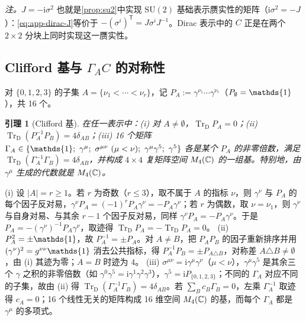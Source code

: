 \documentclass[UTF8,a4paper,11pt,fontset=fandol]{ctexart}
\makeatletter
\let\amsmathbb\mathbb
\renewcommand{\mathbb}[1]{\ifx1#1\mathds{1}\else\amsmathbb{#1}\fi}
\theoremstyle{cplain}
\newtheorem{lemma}[theorem]{引理}
\theoremstyle{cdefinition}
\theoremstyle{cremark}
\renewcommand{\proofname}{证明}
\renewenvironment{proof}[1][\proofname]{\par\pushQED{\qed}\normalfont\topsep6\p@\@plus6\p@\relax
  \trivlist\item[\hskip\labelsep\itshape #1\hspace{0.5em}]\ignorespaces}{\popQED\endtrivlist\@endpefalse}
\numberwithin{equation}{section}
\newcommand{\TrD}{\operatorname{Tr}_{\mathrm{D}}}   %
\newcommand{\tp}{\mathsf{T}}                         %
\newcommand{\ii}{\mathrm{i}}                        %
\makeatother
\begin{document}
\emph{注。}$J=-\ii\sigma^2$ 也就是\cref{prop:su2}中实现 $\mathrm{SU}(2)$ 基础表示赝实性的矩阵（$\ii\sigma^2=-J$）：\cref{eq:app-dirac-J}等价于 $-(\sigma^i)^{\tp}=J\sigma^iJ^{-1}$。Dirac 表示中的 $C$ 正是在两个 $2\times2$ 分块上同时实现这一赝实性。

\subsection{Clifford 基与 \texorpdfstring{$\Gamma_AC$}{Γ\_A C} 的对称性}\label{app:dirac-basis}

对 $\{0,1,2,3\}$ 的子集 $A=\{\nu_1<\cdots<\nu_r\}$，记 $P_A:=\gamma^{\nu_1}\cdots\gamma^{\nu_r}$（$P_\emptyset=\mathbb 1$），共 16 个。

\begin{lemma}[Clifford 基]\label{lem:app-dirac-basis}
在任一表示中：(i) 对 $A\neq\emptyset$，$\TrD P_A=0$；(ii) $\TrD(P_A^{-1}P_B)=4\delta_{AB}$；(iii) 16 个矩阵
$\Gamma_A\in\{\mathbb 1;\ \gamma^\mu;\ \sigma^{\mu\nu}\ (\mu<\nu);\ \gamma^\mu\gamma^5;\ \gamma^5\}$
各是某个 $P_A$ 的非零倍数，满足 $\TrD(\Gamma_A^{-1}\Gamma_B)=4\delta_{AB}$，并构成 $4\times4$ 复矩阵空间 $M_4(\mathbb C)$ 的一组基。特别地，由 $\gamma^\mu$ 生成的代数就是 $M_4(\mathbb C)$。
\end{lemma}

\begin{proof}
(i) 设 $|A|=r\ge1$。若 $r$ 为奇数（$r\le3$），取不属于 $A$ 的指标 $\nu$，则 $\gamma^\nu$ 与 $P_A$ 的每个因子反对易，$\gamma^\nu P_A=(-1)^rP_A\gamma^\nu=-P_A\gamma^\nu$；若 $r$ 为偶数，取 $\nu=\nu_1$，则 $\gamma^\nu$ 与自身对易、与其余 $r-1$ 个因子反对易，同样 $\gamma^\nu P_A=-P_A\gamma^\nu$。于是 $P_A=-(\gamma^\nu)^{-1}P_A\gamma^\nu$，取迹得 $\TrD P_A=-\TrD P_A=0$。
(ii) $P_A^2=\pm\mathbb 1$，故 $P_A^{-1}=\pm P_A$。对 $A\neq B$，把 $P_AP_B$ 的因子重新排序并用 $(\gamma^\nu)^2=g^{\nu\nu}\mathbb 1$ 消去公共指标，得 $P_A^{-1}P_B=\pm P_{A\triangle B}$，对称差 $A\triangle B\neq\emptyset$，由 (i) 其迹为零；$A=B$ 时迹为 $4$。
(iii) $\sigma^{\mu\nu}=\ii\gamma^\mu\gamma^\nu$（$\mu<\nu$），$\gamma^\mu\gamma^5$ 是其余三个 $\gamma$ 之积的非零倍数（如 $\gamma^0\gamma^5=\ii\gamma^1\gamma^2\gamma^3$），$\gamma^5=\ii P_{\{0,1,2,3\}}$；不同的 $\Gamma_A$ 对应不同的子集，故由 (ii) 得 $\TrD(\Gamma_A^{-1}\Gamma_B)=4\delta_{AB}$。若 $\sum_Bc_B\Gamma_B=0$，左乘 $\Gamma_A^{-1}$ 取迹得 $c_A=0$；16 个线性无关的矩阵构成 16 维空间 $M_4(\mathbb C)$ 的基，而每个 $\Gamma_A$ 都是 $\gamma^\mu$ 的多项式。
\end{proof}
\end{document}
